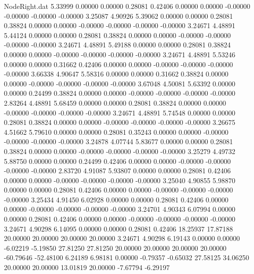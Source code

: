 \begin{filecontents}{NodeRight.dat}
   5.33999    0.00000    0.00000     0.28081    0.42406    0.00000    0.00000   -0.00000   -0.00000   -0.00000   -0.00000    3.25087    4.90926
   5.39062    0.00000    0.00000     0.28081    0.38824    0.00000    0.00000   -0.00000   -0.00000   -0.00000   -0.00000    3.24671    4.48891
   5.44124    0.00000    0.00000     0.28081    0.38824    0.00000    0.00000   -0.00000   -0.00000   -0.00000   -0.00000    3.24671    4.48891
   5.49188    0.00000    0.00000     0.28081    0.38824    0.00000    0.00000   -0.00000   -0.00000   -0.00000   -0.00000    3.24671    4.48891
   5.53246    0.00000    0.00000     0.31662    0.42406    0.00000    0.00000   -0.00000   -0.00000   -0.00000   -0.00000    3.66338    4.90647
   5.58316    0.00000    0.00000     0.31662    0.38824    0.00000    0.00000   -0.00000   -0.00000   -0.00000   -0.00000    3.67048    4.50081
   5.63392    0.00000    0.00000     0.24499    0.38824    0.00000    0.00000   -0.00000   -0.00000   -0.00000   -0.00000    2.83264    4.48891
   5.68459    0.00000    0.00000     0.28081    0.38824    0.00000    0.00000   -0.00000   -0.00000   -0.00000   -0.00000    3.24671    4.48891
   5.74548    0.00000    0.00000     0.28081    0.38824    0.00000    0.00000   -0.00000   -0.00000   -0.00000   -0.00000    3.26675    4.51662
   5.79610    0.00000    0.00000     0.28081    0.35243    0.00000    0.00000   -0.00000   -0.00000   -0.00000   -0.00000    3.24878    4.07744
   5.83677    0.00000    0.00000     0.28081    0.38824    0.00000    0.00000   -0.00000   -0.00000   -0.00000   -0.00000    3.25279    4.49732
   5.88750    0.00000    0.00000     0.24499    0.42406    0.00000    0.00000   -0.00000   -0.00000   -0.00000   -0.00000    2.83720    4.91087
   5.93807    0.00000    0.00000     0.28081    0.42406    0.00000    0.00000   -0.00000   -0.00000   -0.00000   -0.00000    3.25040    4.90855
   5.98870    0.00000    0.00000     0.28081    0.42406    0.00000    0.00000   -0.00000   -0.00000   -0.00000   -0.00000    3.25434    4.91450
   6.02928    0.00000    0.00000     0.28081    0.42406    0.00000    0.00000   -0.00000   -0.00000   -0.00000   -0.00000    3.24701    4.90343
   6.07994    0.00000    0.00000     0.28081    0.42406    0.00000    0.00000   -0.00000   -0.00000   -0.00000   -0.00000    3.24671    4.90298
   6.14095    0.00000    0.00000     0.28081    0.42406   18.25937   17.87188   20.00000   20.00000   20.00000   20.00000    3.24671    4.90298
   6.19143    0.00000    0.00000    -6.02219   -5.19850   27.81250   27.81250   20.00000   20.00000   20.00000   20.00000  -60.79646  -52.48100
   6.24189    6.98181    0.00000    -0.79357   -0.65032   27.58125   34.06250   20.00000   20.00000   13.01819   20.00000   -7.67794   -6.29197

\end{filecontents}
